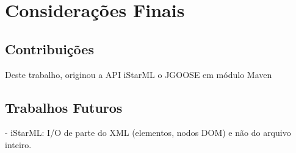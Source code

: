    \chapter{Considerações Finais}
        \label{cap:conclusao}
    \section{Contribuições}
        Deste trabalho,
            originou a API iStarML
            o JGOOSE em módulo Maven %

    \section{Trabalhos Futuros}

        - iStarML:
            I/O de parte do XML (elementos, nodos DOM) e não do arquivo inteiro.

